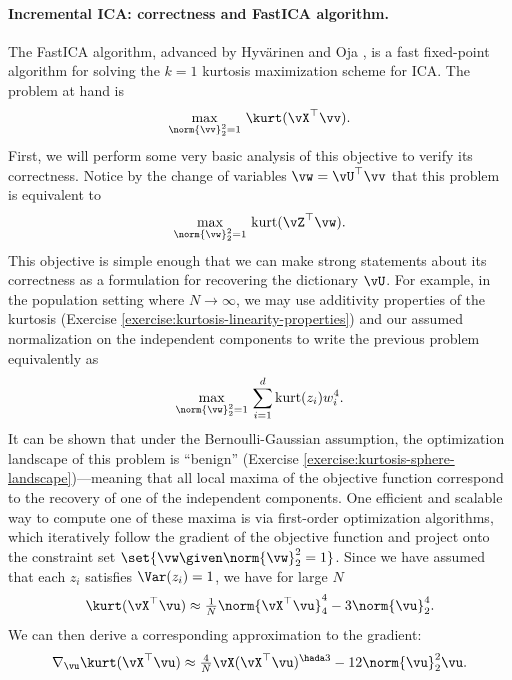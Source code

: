 \documentclass[../../book-main.tex]{subfiles}
\begin{document}
\paragraph{Incremental ICA: correctness and FastICA algorithm.}
The FastICA algorithm, advanced by Hyv\"{a}rinen and Oja \cite{hyvarinen-1997}, is a fast fixed-point algorithm for solving the $k=1$ kurtosis maximization scheme for ICA.
The problem at hand is
\begin{equation}\label{eq:kurtosis-maximization-sphere-finitesample}
    \max_{\norm{\vv}_2^2 = 1}\, \kurt(\vX^\top \vv).
\end{equation}
First, we will perform some very basic analysis of this objective to verify its correctness. Notice by the change of variables $\vw = \vU^\top \vv$ that this problem is equivalent to
\begin{equation*}
    \max_{\norm{\vw}_2^2 = 1}\, 
    \mathrm{kurt}(\vZ^\top \vw).
\end{equation*}
This objective is simple enough that we can make strong statements about its correctness as a formulation for recovering the dictionary $\vU$.
For example, in the population setting where $N \to \infty$, 
we may use additivity properties of the kurtosis (Exercise \ref{exercise:kurtosis-linearity-properties}) and our assumed normalization on the independent components to write the previous problem equivalently as
\begin{equation}\label{eq:kurtosis-maximization-sphere-population-simple}
    \max_{\norm{\vw}_2^2 = 1}\, 
    \sum_{i=1}^d \mathrm{kurt}(z_i) w_i^4.
\end{equation}
It can be shown that under the Bernoulli-Gaussian assumption, the optimization landscape of this problem is ``benign'' (Exercise \ref{exercise:kurtosis-sphere-landscape})---meaning that all local maxima of the objective function correspond to the recovery of one of the independent components.
One efficient and scalable way to compute one of these maxima is via first-order optimization algorithms, which iteratively follow the gradient of the objective function and project onto the constraint set $\set{\vw \given \norm{\vw}_2^2 = 1}$.
Since we have assumed that each $z_i$ satisfies $\Var(z_i)=1$, we 
have for large $N$
\begin{equation}\label{eq:kurtosis-approximation-l4}
    \kurt(\vX^\top \vu)
    \approx
    \tfrac{1}{N} \norm{\vX^\top \vu}_4^4 - 3 \norm{\vu}_2^4.
\end{equation}
We can then derive a corresponding approximation to the gradient:
\begin{equation*}
    \nabla_{\vu} \kurt(\vX^\top \vu)
    \approx
    \tfrac{4}{N} \vX (\vX^\top \vu)^{\hada 3}
    - 12 \norm{\vu}_2^2 \vu.
\end{equation*}
\end{document}
